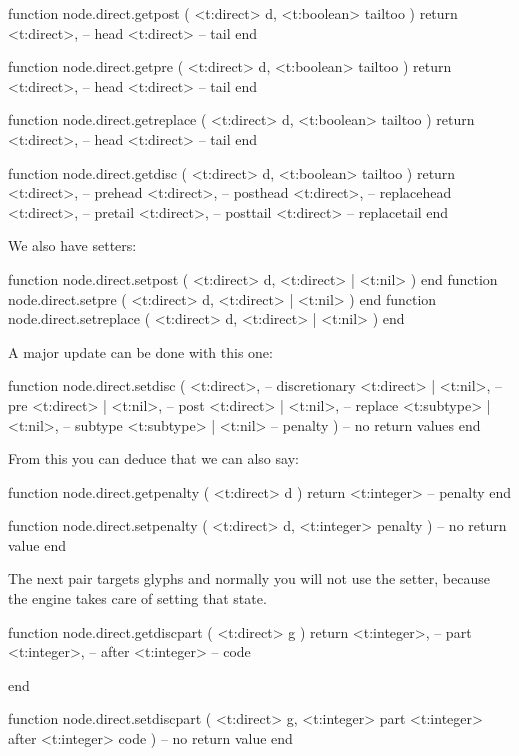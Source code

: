 \starttyping[option=LUA]
function node.direct.getpost ( <t:direct> d, <t:boolean> tailtoo )
    return
        <t:direct>, -- head
        <t:direct>  -- tail
end

function node.direct.getpre ( <t:direct> d, <t:boolean> tailtoo )
    return
        <t:direct>, -- head
        <t:direct>  -- tail
end

function node.direct.getreplace ( <t:direct> d, <t:boolean> tailtoo )
    return
        <t:direct>, -- head
        <t:direct>  -- tail
end
\stoptyping

\starttyping[option=LUA]
function node.direct.getdisc ( <t:direct> d, <t:boolean> tailtoo )
    return
        <t:direct>, -- prehead
        <t:direct>, -- posthead
        <t:direct>, -- replacehead
        <t:direct>, -- pretail
        <t:direct>, -- posttail
        <t:direct>  -- replacetail
end
\stoptyping

We also have setters:

\starttyping[option=LUA]
function node.direct.setpost    ( <t:direct> d, <t:direct> | <t:nil> ) end
function node.direct.setpre     ( <t:direct> d, <t:direct> | <t:nil> ) end
function node.direct.setreplace ( <t:direct> d, <t:direct> | <t:nil> ) end
\stoptyping

A major update can be done with this one:

\starttyping[option=LUA]
function node.direct.setdisc (
    <t:direct>,            -- discretionary
    <t:direct>  | <t:nil>, -- pre
    <t:direct>  | <t:nil>, -- post
    <t:direct>  | <t:nil>, -- replace
    <t:subtype> | <t:nil>, -- subtype
    <t:subtype> | <t:nil>  -- penalty
)
    -- no return values
end
\stoptyping

From this you can deduce that we can also say:

\starttyping[option=LUA]
function node.direct.getpenalty ( <t:direct> d )
    return <t:integer> -- penalty
end

function node.direct.setpenalty ( <t:direct> d, <t:integer> penalty )
    -- no return value
end
\stoptyping

The next pair targets glyphs and normally you will not use the setter, because
the engine takes care of setting that state.

\starttyping[option=LUA]
function node.direct.getdiscpart ( <t:direct> g )
    return
        <t:integer>, -- part
        <t:integer>, -- after
        <t:integer>  -- code

end

function node.direct.setdiscpart (
    <t:direct>  g,
    <t:integer> part
    <t:integer> after
    <t:integer> code
)
    -- no return value
end
\stoptyping

